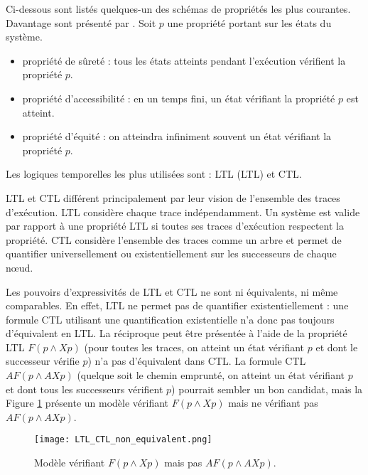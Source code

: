 Ci-dessous sont listés quelques-un des schémas de propriétés les plus
courantes. Davantage sont présenté par \citep{LTL_scheme}. Soit \(p\) une
propriété portant sur les états du système.

\begin{itemize}
\item
  propriété de sûreté : tous les états atteints pendant l'exécution
  vérifient la propriété \(p\).
\item
  propriété d'accessibilité : en un temps fini, un état vérifiant la
  propriété \(p\) est atteint.
\item
  propriété d'équité : on atteindra infiniment souvent un état vérifiant la
  propriété \(p\).
\end{itemize}

Les logiques temporelles les plus utilisées sont : \acl{LTL} (\ac{LTL})
et \ac{CTL}.

\ac{LTL} et \ac{CTL} différent principalement par leur vision de l'ensemble des
traces d'exécution. \ac{LTL} considère chaque trace indépendamment. Un
système est valide par rapport à une propriété \ac{LTL} si toutes ses traces
d'exécution respectent la propriété. \ac{CTL} considère l'ensemble des traces
comme un arbre et permet de quantifier universellement
ou existentiellement sur les successeurs de chaque nœud.

Les pouvoirs d'expressivités de \ac{LTL} et \ac{CTL} ne sont ni équivalents, ni même
comparables. En effet, \ac{LTL} ne permet pas de quantifier existentiellement :
une formule \ac{CTL} utilisant une quantification existentielle n'a donc pas
toujours d'équivalent en \ac{LTL}. La réciproque peut être présentée à l'aide de
la propriété \ac{LTL} \(F (p \land X p)\) (pour toutes les traces, on atteint un
état vérifiant \(p\) et dont le successeur vérifie \(p\)) n'a pas d'équivalent
dans \ac{CTL}. La formule \ac{CTL} \(AF (p \land AX p)\) (quelque soit le chemin
emprunté, on atteint un état vérifiant \(p\) et dont tous les successeurs
vérifient \(p\)) pourrait sembler un bon candidat, mais la Figure
\ref{LTL_vs_CTL} présente un modèle vérifiant \(F (p \land X p)\) mais ne
vérifiant pas \(AF (p \land AX p)\).

\begin{figure}
\begin{center}
\texttt{[image: LTL\_CTL\_non\_equivalent.png]}
\caption{Modèle vérifiant \(F (p \land X p)\) mais pas \(AF (p \land AX p)\).}
\label{LTL_vs_CTL}
\end{center}
\end{figure}

